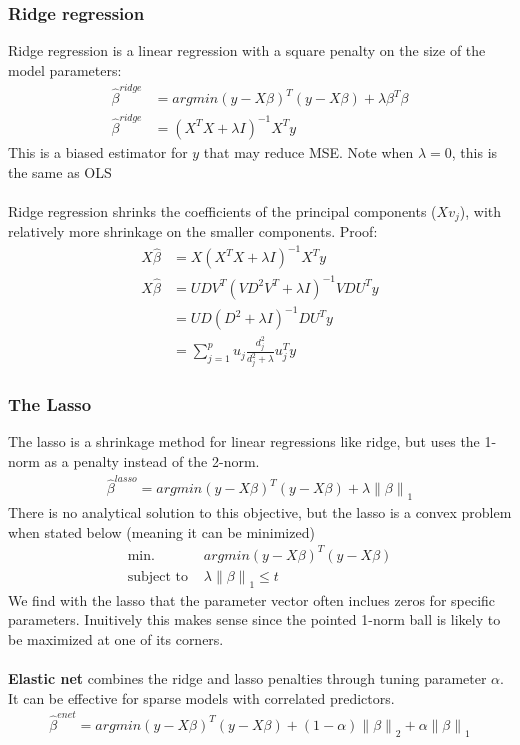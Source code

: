 \documentclass{article}
\newcommand{\norm}[2]{\left\lVert#1\right\rVert_#2}
\begin{document}
\subsubsection{Ridge regression}
Ridge regression is a linear regression with a square penalty on the size of the model parameters:
\begin{align*}
  \hat{\beta}^{ridge} &= argmin(y - X\beta)^T(y - X\beta) + \lambda\beta^T\beta\\
  \hat{\beta}^{ridge} &= (X^TX + \lambda I)^{-1}X^Ty
\end{align*}
This is a biased estimator for $y$ that may reduce MSE. Note when $\lambda = 0$, this is the same as OLS\\\\
Ridge regression shrinks the coefficients of the principal components ($Xv_j$), with relatively more shrinkage on the smaller components. Proof:
\begin{align*}
  X\hat{\beta} &= X(X^TX + \lambda I)^{-1}X^Ty\\
  X\hat{\beta} &= UDV^T(VD^2V^T + \lambda I)^{-1}VDU^Ty\\
  &= UD(D^2 + \lambda I)^{-1}DU^Ty\\
  &= \sum_{j=1}^pu_j \frac{d_j^2}{d_j^2 + \lambda}u_j^Ty
\end{align*}

\subsubsection{The Lasso}
The lasso is a shrinkage method for linear regressions like ridge, but uses the 1-norm as a penalty instead of the 2-norm. 
\begin{align*}
  \hat{\beta}^{lasso} = argmin(y - X\beta)^T(y - X\beta) + \lambda \norm{\beta}{1}
\end{align*}
There is no analytical solution to this objective, but the lasso is a convex problem when stated below (meaning it can be minimized)
\begin{align*}
  \textrm{min. } & argmin(y - X\beta)^T(y - X\beta)\\
  \textrm{subject to } & \lambda \norm{\beta}{1} \leq t
\end{align*}
We find with the lasso that the parameter vector often inclues zeros for specific parameters. Inuitively this makes sense since the pointed 1-norm ball is likely to be maximized at one of its corners.\\\\
\textbf{Elastic net} combines the ridge and lasso penalties through tuning parameter $\alpha$. It can be effective for sparse models with correlated predictors.
\begin{align*}
  \hat{\beta}^{enet} = argmin(y - X\beta)^T(y - X\beta) + (1-\alpha) \norm{\beta}{2} + \alpha \norm{\beta}{1}
\end{align*}
\end{document}
